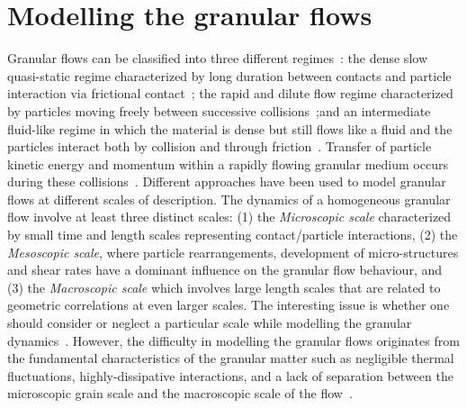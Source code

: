 \section{Modelling the granular flows}
Granular flows can be classified into three different 
regimes~\citep{Jaeger1996}: the dense slow quasi-static regime characterized by 
long duration between contacts and particle interaction via frictional 
contact~\citep{Roux2002}; the rapid and dilute flow regime characterized by 
particles moving freely between successive 
collisions~\citep{Goldhirsch2003};and an intermediate fluid-like regime in 
which the material is dense but still flows like a fluid and the particles 
interact both by collision and through friction~\citep{Midi2004,Pouliquen2002}. 
Transfer of particle kinetic energy and momentum within a rapidly flowing 
granular medium occurs during these collisions~\citep{Popken1999}. Different 
approaches have been used to model granular flows at different scales of 
description. The dynamics of a homogeneous granular flow involve at least three 
distinct scales: (1) the \textit{Microscopic scale} characterized by small time 
and length scales representing contact/particle interactions, (2) the 
\textit{Mesoscopic scale}, where particle rearrangements, development of 
micro-structures and shear rates have a dominant influence on the granular flow 
behaviour, and (3) the \textit{Macroscopic scale} which involves large length 
scales that are related to geometric correlations at even larger scales. The 
interesting issue is whether one should consider or neglect a particular scale 
while modelling the granular dynamics~\citep{Radjai2009}. However, the 
difficulty in modelling the granular flows originates from the fundamental 
characteristics of the granular matter such as negligible thermal fluctuations, 
highly-dissipative interactions, and a lack of separation between the 
microscopic grain scale and the macroscopic scale of the 
flow~\citep{Goldhirsch2003}. 

